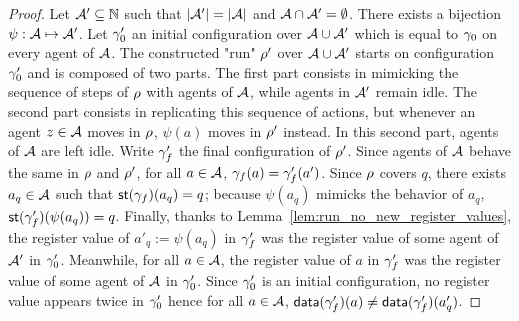 \begin{proof}
Let $\mathcal{A}' \subseteq \mathbb{N}$ such that $|\mathcal{A}'|= |\mathcal{A}|$ and $\mathcal{A} \cap \mathcal{A}' = \emptyset$. 
There exists a bijection $\psi: \mathcal{A} \mapsto \mathcal{A}'$. Let $\gamma_0'$ an initial configuration over $\mathcal{A} \cup \mathcal{A}'$ which is equal to $\gamma_0$ on every agent of $\mathcal{A}$. 
The constructed "run" $\rho'$ over $\mathcal{A} \cup \mathcal{A}'$ starts on configuration $\gamma_0'$ and is composed of two parts. 
The first part consists in mimicking the sequence of steps of $\rho$ with agents of $\mathcal{A}$, while agents in $\mathcal{A}'$ remain idle. 
The second part consists in replicating this sequence of actions, but whenever an agent $z \in \mathcal{A}$ moves in $\rho$, 
$\psi(a)$ moves in $\rho'$ instead. In this second part, agents of $\mathcal{A}$ are left idle. Write $\gamma_f'$ the final configuration of $\rho'$. Since agents of $\mathcal{A}$ behave the same in $\rho$ and $\rho'$, for all $a \in \mathcal{A}$, $\gamma_f(a) = \gamma_f'(a')$.
Since $\rho$ covers $q$, 
there exists $a_q \in \mathcal{A}$ such that $\mathsf{st}(\gamma_f)(a_q) = q$;
because $\psi(a_q)$ mimicks the behavior of $a_q$, $\mathsf{st}(\gamma_f')(\psi(a_q)) = q$. Finally, thanks to Lemma~\ref{lem:run_no_new_register_values}, the register value of $a'_q := \psi(a_q)$ in $\gamma_f'$ was the register value of some agent of $\mathcal{A}'$ in $\gamma_0'$. Meanwhile, for all $a \in \mathcal{A}$, the register value of $a$ in $\gamma_f'$ was the register value of some agent of $\mathcal{A}$ in $\gamma_0'$. Since $\gamma_0'$ is an initial configuration, no register value appears twice in $\gamma_0'$ hence for all $a \in \mathcal{A}$, $\mathsf{data}(\gamma_f')(a) \ne \mathsf{data}(\gamma_f')(a'_q)$.
\end{proof}

